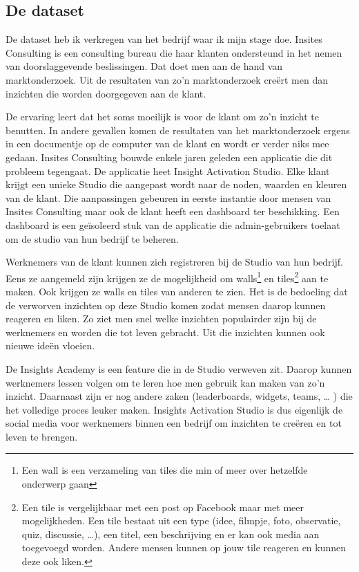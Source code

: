 \subsection{De dataset}
De dataset heb ik verkregen van het bedrijf waar ik mijn stage doe. Insites Consulting is een consulting bureau die haar klanten ondersteund in het nemen van doorslaggevende beslissingen. Dat doet men aan de hand van marktonderzoek. Uit de resultaten van zo'n marktonderzoek creërt men dan inzichten die worden doorgegeven aan de klant. 

De ervaring leert dat het soms moeilijk is voor de klant om zo'n inzicht te benutten. In andere gevallen komen de resultaten van het marktonderzoek ergens in een documentje op de computer van de klant en wordt er verder niks mee gedaan. Insites Consulting bouwde enkele jaren geleden een applicatie die dit probleem tegengaat. De applicatie heet Insight Activation Studio. Elke klant krijgt een unieke Studio die aangepast wordt naar de noden, waarden en kleuren van de klant. Die aanpassingen gebeuren in eerste instantie door mensen van Insites Consulting maar ook de klant heeft een dashboard ter beschikking. Een dashboard is een geïsoleerd stuk van de applicatie die admin-gebruikers toelaat om de studio van hun bedrijf te beheren.  

Werknemers van de klant kunnen zich registreren bij de Studio van hun bedrijf. Eens ze aangemeld zijn krijgen ze de mogelijkheid om walls\footnote{Een wall is een verzameling van tiles die min of meer over hetzelfde onderwerp gaan} en tiles\footnote{Een tile is vergelijkbaar met een post op Facebook maar met meer mogelijkheden. Een tile bestaat uit een type (idee, filmpje, foto, observatie, quiz, discussie, …), een titel, een beschrijving en er kan ook media aan toegevoegd worden. Andere mensen kunnen op jouw tile reageren en kunnen deze ook liken.} aan te maken. Ook krijgen ze walls en tiles van anderen te zien. Het is de bedoeling dat de verworven inzichten op deze Studio komen zodat mensen daarop kunnen reageren en liken. Zo ziet men snel welke inzichten populairder zijn bij de werknemers en worden die tot leven gebracht. Uit die inzichten kunnen ook nieuwe ideën vloeien.

De Insights Academy is een feature die in de Studio verweven zit. Daarop kunnen werknemers lessen volgen om te leren hoe men gebruik kan maken van zo’n inzicht. Daarnaast zijn er nog andere zaken (leaderboards, widgets, teams, … ) die het volledige proces leuker maken. Insights Activation Studio is dus eigenlijk de social media voor werknemers binnen een bedrijf om inzichten te creëren en tot leven te brengen.


